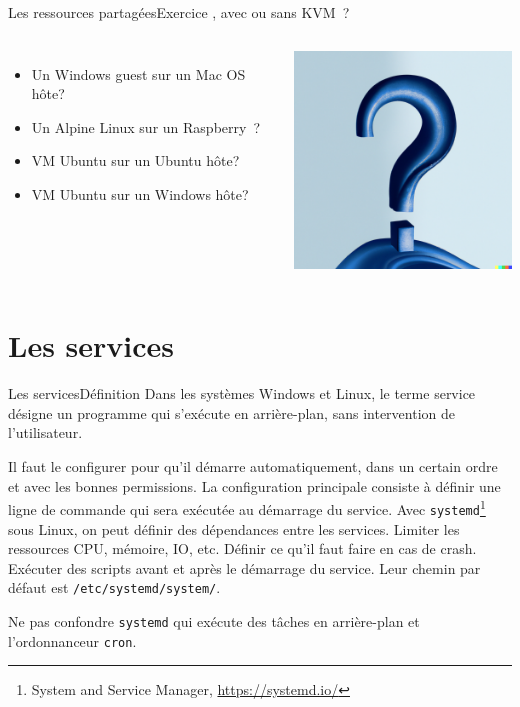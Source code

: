 \documentclass{beamer}
\begin{document}
    \begin{frame}{Les ressources partagées}{Exercice \execcounterdispinc{}, avec ou sans KVM~?}
        \begin{columns}
            \begin{itemize}
                \item Un Windows guest sur un Mac OS hôte?
                \item Un Alpine Linux sur un Raspberry\footnotemark~?
                \item VM Ubuntu sur un Ubuntu hôte?
                \item VM Ubuntu sur un Windows hôte?
            \end{itemize}
            \centering
            \includegraphics[width=6cm]{image/question-mark-on-a-blank-background}
        \end{columns}
    \end{frame}


    \section{Les services}\label{sec:les-services}

    \begin{frame}{Les services}{Définition}
        Dans les systèmes Windows et Linux, le terme service désigne un programme qui s'exécute en arrière-plan, sans intervention de l'utilisateur.

        Il faut le configurer pour qu'il démarre automatiquement, dans un certain ordre et avec les bonnes permissions.
        \bigbreak
        La configuration principale consiste à définir une ligne de commande qui sera exécutée au démarrage du service.
        \bigbreak
        Avec \lstinline{systemd}\footnote{System and Service Manager, \url{https://systemd.io/}} sous Linux, on peut définir des dépendances entre les services.
        Limiter les ressources CPU, mémoire, IO, etc.
        Définir ce qu'il faut faire en cas de crash.
        Exécuter des scripts avant et après le démarrage du service.
        \bigbreak
        Leur chemin par défaut est \lstinline{/etc/systemd/system/}.
        \begin{dangercolorbox}
            Ne pas confondre \lstinline{systemd} qui exécute des tâches en arrière-plan et l'ordonnanceur \lstinline{cron}.
        \end{dangercolorbox}
    \end{frame}
\end{document}
